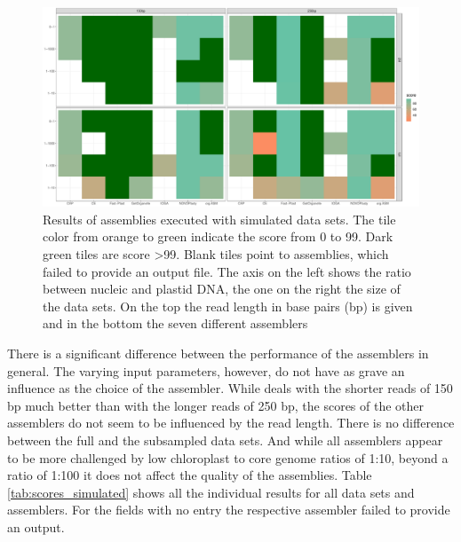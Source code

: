\begin{figure}[H]
\centering
\includegraphics[height=.55\textheight, width=.99\textwidth]{Figures/sim_tiles}
\decoRule
\caption[Score of assemblies of simulated data sets]{Results of assemblies executed with
  simulated data sets. The tile color from orange to green indicate the score from 0 to
  99. Dark green tiles are score >99. Blank tiles point to assemblies, which failed to
  provide an output file. The axis on the left shows the ratio between nucleic and
  plastid DNA, the one on the right the size of the data sets. On the top the read length
  in base pairs (bp) is given and in the bottom the seven different assemblers}
\label{fig:sim_tiles}
\end{figure}

There is a significant difference between the performance of the assemblers in general.
The varying input parameters, however, do not have as grave an influence as the choice of
the assembler. While \fp \hspace{0.5ex} deals with the shorter reads of 150 bp much better
than with the longer reads of 250 bp, the scores of the other assemblers do not seem to be
influenced by the read length. There is no difference between the full and the subsampled
data sets. And while all assemblers appear to be more challenged by low chloroplast to
core genome ratios of 1:10, beyond a ratio of 1:100 it does not affect the quality of the
assemblies. Table \ref{tab:scores_simulated} shows all the individual results for all data
sets and assemblers. For the fields with no entry the respective assembler failed to
provide an output.

